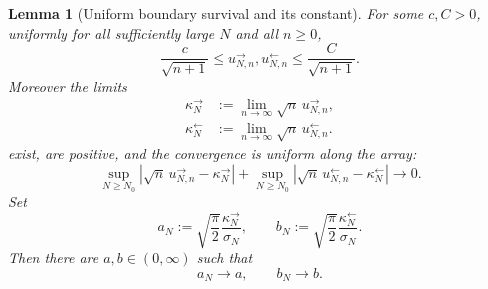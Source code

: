 \documentclass[11pt]{article}
\theoremstyle{plain}
\newtheorem{lemma}{Lemma}[section]
\theoremstyle{definition}
\theoremstyle{remark}
\begin{document}
\begin{lemma}[Uniform boundary survival and its constant]
\label{lem:survivalprob}
For some \(c,C>0\), uniformly for all sufficiently large \(N\) and all
\(n\ge0\),
\begin{equation}
 \frac{c}{\sqrt{n+1}}
 \le u_{N,n}^{\rightarrow},u_{N,n}^{\leftarrow}
 \le \frac{C}{\sqrt{n+1}}.
 \label{eq:boundary-survival}
\end{equation}
Moreover the limits
{
\begin{align*}
 \kappa_N^{\rightarrow}
 &:=\lim_{n\to\infty}\sqrt n\,u_{N,n}^{\rightarrow},\\
 \kappa_N^{\leftarrow}
 &:=\lim_{n\to\infty}\sqrt n\,u_{N,n}^{\leftarrow}.
\end{align*}}
exist, are positive, and the convergence is uniform along the array:
\begin{equation}
 \sup_{N\ge N_0}
 \left|\sqrt n\,u_{N,n}^{\rightarrow}-\kappa_N^{\rightarrow}\right|
 +\sup_{N\ge N_0}
 \left|\sqrt n\,u_{N,n}^{\leftarrow}-\kappa_N^{\leftarrow}\right|
 \longrightarrow0.
 \label{eq:uniform-survival-asymptotic}
\end{equation}
Set
\begin{equation*}
 a_N:=\sqrt{\frac\pi2}\frac{\kappa_N^{\rightarrow}}{\sigma_N},
 \qquad
 b_N:=\sqrt{\frac\pi2}\frac{\kappa_N^{\leftarrow}}{\sigma_N}.
\end{equation*}
Then there are \(a,b\in(0,\infty)\) such that
\begin{equation}
 a_N\longrightarrow a,
 \qquad b_N\longrightarrow b.
 \label{eq:survival-constant-convergence}
\end{equation}
\end{lemma}
\end{document}
